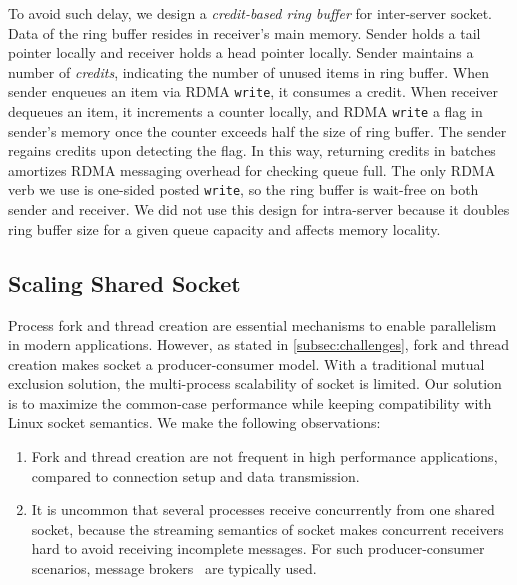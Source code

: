 To avoid such delay, we design a \textit{credit-based ring buffer} for inter-server socket. Data of the ring buffer resides in receiver's main memory. Sender holds a tail pointer locally and receiver holds a head pointer locally. Sender maintains a number of \textit{credits}, indicating the number of unused items in ring buffer. When sender enqueues an item via RDMA \texttt{write}, it consumes a credit. When receiver dequeues an item, it increments a counter locally, and RDMA \texttt{write} a flag in sender's memory once the counter exceeds half the size of ring buffer. The sender regains credits upon detecting the flag. In this way, returning credits in batches amortizes RDMA messaging overhead for checking queue full. The only RDMA verb we use is one-sided posted \texttt{write}, so the ring buffer is wait-free on both sender and receiver. We did not use this design for intra-server because it doubles ring buffer size for a given queue capacity and affects memory locality.


\subsection{Scaling Shared Socket}
\label{subsec:fork}

Process fork and thread creation are essential mechanisms to enable parallelism in modern applications. 
However, as stated in \ref{subsec:challenges}, fork and thread creation makes socket a producer-consumer model. With a traditional mutual exclusion solution, the multi-process scalability of socket is limited. Our solution is to maximize the common-case performance while keeping compatibility with Linux socket semantics.
We make the following observations:
\begin{enumerate}
	\item Fork and thread creation are not frequent in high performance applications, compared to connection setup and data transmission.
	\item It is uncommon that several processes receive concurrently from one shared socket, because the streaming semantics of socket makes concurrent receivers hard to avoid receiving incomplete messages. For such producer-consumer scenarios, message brokers~\cite{hintjens2013zeromq,rabbitmq2017rabbitmq,kreps2011kafka} are typically used.
\end{enumerate}

